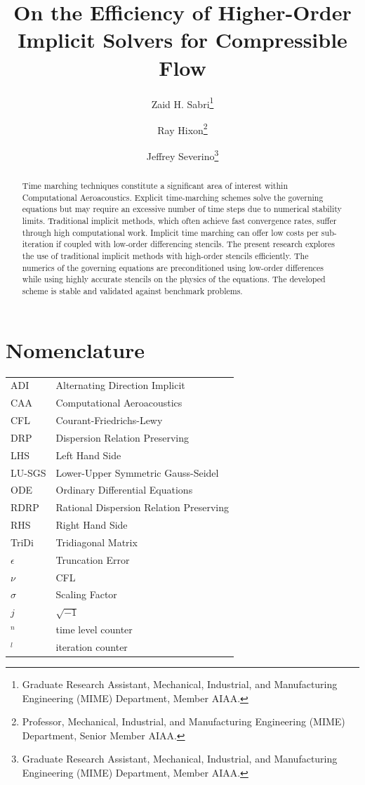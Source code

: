 \documentclass[conf]{new-aiaa}
\title{On the Efficiency of Higher-Order Implicit Solvers for Compressible Flow
}
\author{Zaid H. Sabri\footnote{Graduate Research Assistant, Mechanical, Industrial, and Manufacturing Engineering (MIME) Department, Member AIAA.}}
\author{Ray Hixon\footnote{Professor, Mechanical, Industrial, and Manufacturing Engineering (MIME) Department, Senior Member AIAA.}}
\author{Jeffrey Severino\footnote{Graduate Research Assistant, Mechanical, Industrial, and Manufacturing Engineering (MIME) Department, Member AIAA.}}
\affil{University of Toledo, Toledo, OH, 43606}
\begin{document}
\maketitle

\begin{abstract}

 
Time marching techniques constitute a significant area of interest within Computational Aeroacoustics. 
Explicit time-marching schemes solve the governing equations but may require an excessive number of time steps due to numerical stability limits.
Traditional implicit methods, which often achieve fast convergence rates, suffer through high computational work. 
Implicit time marching can offer low costs per sub-iteration if coupled with low-order differencing stencils. 
The present research explores the use of traditional implicit methods with high-order stencils efficiently. 
The numerics of the governing equations are preconditioned using low-order differences while using highly accurate stencils on the physics of the equations. 
The developed scheme is stable and validated against benchmark problems.

\end{abstract}

\section{Nomenclature}

{\renewcommand\arraystretch{1.0}
\noindent\begin{longtable*}{@{}l @{\quad=\quad} l@{}}
ADI & Alternating Direction Implicit \\
CAA  & Computational Aeroacoustics \\
CFL &    Courant-Friedrichs-Lewy \\
DRP & Dispersion Relation Preserving \\
LHS & Left Hand Side \\ 
LU-SGS & Lower-Upper Symmetric Gauss-Seidel \\ 
ODE & Ordinary Differential Equations \\
RDRP & Rational Dispersion Relation Preserving \\
RHS & Right Hand Side \\
TriDi & Tridiagonal Matrix \\
$\epsilon$ & Truncation Error \\
$\nu$ & CFL \\
$\sigma$ & Scaling Factor \\
$j$ & $\sqrt{-1}$ \\
$^{n}$ & time level counter \\
$^{l}$ & iteration counter

\end{longtable*}}
\end{document}
